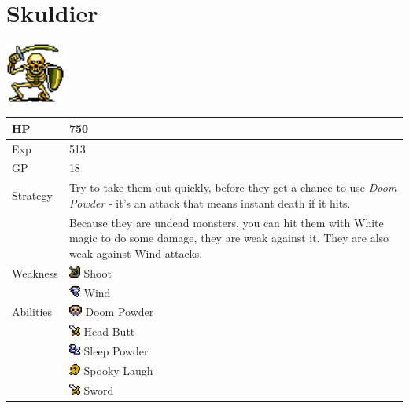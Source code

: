 \section{Skuldier}
\label{monster:skuldier}

\includegraphics[height=2cm,keepaspectratio]{./resources/monster/skuldier}

\begin{longtable}{ l p{9cm} }
	HP
	& 750
\\ \hline
	Exp
	& 513
\\ \hline
	GP
	& 18
\\ \hline
	Strategy
	& Try to take them out quickly, before they get a chance to use \textit{Doom Powder} - it's an attack that means instant death if it hits. \\
	& Because they are undead monsters, you can hit them with White magic to do some damage, they are weak against it. They are also weak against Wind attacks.
\\ \hline
	Weakness
	& \includegraphics[height=1em,keepaspectratio]{./resources/effects/shoot} Shoot \\
	& \includegraphics[height=1em,keepaspectratio]{./resources/effects/wind} Wind
\\ \hline
	Abilities
	& \includegraphics[height=1em,keepaspectratio]{./resources/effects/fatal} Doom Powder \\
	& \includegraphics[height=1em,keepaspectratio]{./resources/effects/damage} Head Butt \\
	& \includegraphics[height=1em,keepaspectratio]{./resources/effects/sleep} Sleep Powder \\
	& \includegraphics[height=1em,keepaspectratio]{./resources/effects/confusion} Spooky Laugh \\
	& \includegraphics[height=1em,keepaspectratio]{./resources/effects/damage} Sword
\end{longtable}
